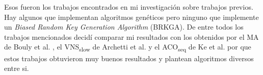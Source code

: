 \bigskip

Esos fueron los trabajos encontrados en mi investigación sobre trabajos previos. Hay algunos que implementan algoritmos genéticos pero ninguno que implemente un \textit{Biased Random Key Generation Algorithm} (BRKGA). De entre todos los trabajos mencionados decidí comparar mi resultados con los obtenidos por el MA de Bouly et al. \cite{BoulyDangMoukrim}, el VNS\textsubscript{slow} de Archetti et al. \cite{ArchettiHertzSperanza} y el ACO\textsubscript{seq} de Ke et al. \cite{KeArchettiFeng} por que estos trabajos obtuvieron muy buenos resultados y plantean algoritmos diversos entre si.









